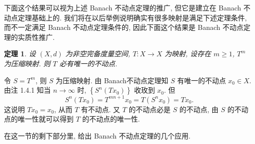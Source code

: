 \documentclass[openany]{ctexbook}
\makeatletter
\theoremstyle{kaiti}
\newtheorem{theorem}{定理}[section]
\theoremstyle{normal}
\renewenvironment{proof}[1][\proofname]{\par
    \pushQED{\qed}%
    \normalfont \topsep6\p@\@plus6\p@\relax
    \trivlist
    \item\relax
    {\heiti #1}\hspace{2\labelsep}\ignorespaces
  }{%
    \popQED\endtrivlist\@endpefalse
  }
\makeatother
\begin{document}
下面这个结果可以视为上述 Banach 不动点定理的推广, 但它是建立在 Banach 不动点定理基础上的. 我们将在以后举例说明确实有很多映射是满足下述定理条件, 而不一定满足 Banach 不动点定理条件的, 因此下面这个结果是 Banach 不动点定理的实质性推广.

\begin{theorem}
设 $(X, d)$ 为非空完备度量空间, $T: X \rightarrow X$ 为映射, 设存在 $m \geqslant 1$, $T^m$ 为压缩映射. 则 $T$ 必有唯一的不动点.
\end{theorem}

\begin{proof}
令 $S=T^m$, 则 $S$ 为压缩映射. 由 Banach不动点定理知 $S$ 有唯一的不动点 $x_0 \in X$. 由注 1.4.1 知当 $n \rightarrow \infty$ 时, $\left\{S^n\left(T x_0\right)\right\}$ 收玫到 $x_0$. 但
$$
S^n\left(T x_0\right)=T^{m n+1} x_0=T\left(S^n x_0\right)=T x_0.
$$
这说明 $T x_0=x_0$, 从而 $T$ 有不动点. 又 $T$ 的不动点必是 $S$ 的不动点, 由 $S$ 的不动点的唯一性就可以得到 $T$ 的不动点的唯一性.
\end{proof}

在这一节的剩下部分里, 给出 Banach 不动点定理的几个应用.
\end{document}

